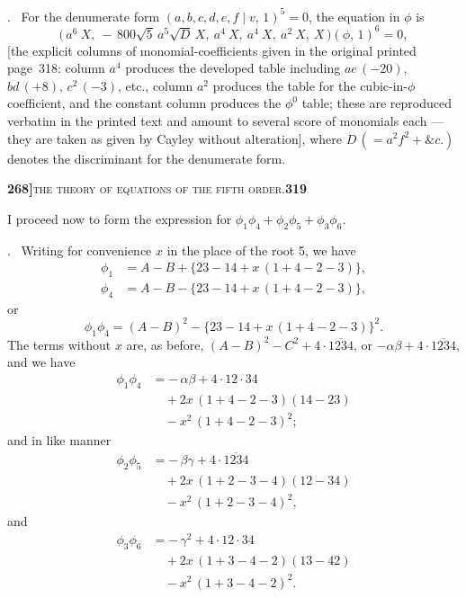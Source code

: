 \documentclass[11pt]{article}
\newcommand{\Cdel}{\mid}
\begin{document}
\medskip

. \ For the denumerate form $(a, b, c, d, e, f\Cdel v,\,1)^5 = 0$, the equation in $\phi$ is
\[
   \bigl(\,a^6\ X,\ -\,800\sqrt{5}\,a^5\sqrt{D}\,X,\ a^4\ X,\ a^4\ X,\ a^2\ X,\ X\,\bigr)(\phi,\,1)^6 = 0,
\]
[the explicit columns of monomial-coefficients given in the original printed page~318: column $a^4$ produces the developed table including $a e\,(-20)$, $b d\,(+8)$, $c^2\,(-3)$, etc., column $a^2$ produces the table for the cubic-in-$\phi$ coefficient, and the constant column produces the $\phi^0$ table; these are reproduced verbatim in the printed text and amount to several score of monomials each --- they are taken as given by Cayley without alteration], where $D\,(= a^2 f^2 + \&c.)$ denotes the discriminant for the denumerate form.

\newpage
\setcounter{page}{319}

\noindent\textbf{268]}\hfill\textsc{the theory of equations of the fifth order.}\hfill\textbf{319}

\medskip

\noindent I proceed now to form the expression for $\phi_1\phi_4 + \phi_2\phi_5 + \phi_3\phi_6$.

\medskip

. \ Writing for convenience $x$ in the place of the root 5, we have
\[
\begin{aligned}
   \phi_1 &= A - B + \{23 - 14 + x\,(1 + 4 - 2 - 3)\},\\
   \phi_4 &= A - B - \{23 - 14 + x\,(1 + 4 - 2 - 3)\},
\end{aligned}
\]
or
\[
   \phi_1\phi_4 = (A - B)^2 - \{23 - 14 + x\,(1 + 4 - 2 - 3)\}^2.
\]
The terms without $x$ are, as before, $(A - B)^2 - C^2 + 4\cdot\overline{1234}$, or $-\alpha\beta + 4\cdot\overline{1234}$, and we have
\[
\begin{aligned}
   \phi_1\phi_4 &= -\,\alpha\beta + 4\cdot 12\cdot 34\\
   &\quad{} + 2 x\,(1 + 4 - 2 - 3)(14 - 23)\\
   &\quad{} - x^2\,(1 + 4 - 2 - 3)^2;
\end{aligned}
\]
and in like manner
\[
\begin{aligned}
   \phi_2\phi_5 &= -\,\beta\gamma + 4\cdot\overline{1234}\\
   &\quad{} + 2 x\,(1 + 2 - 3 - 4)(12 - 34)\\
   &\quad{} - x^2\,(1 + 2 - 3 - 4)^2,
\end{aligned}
\]
and
\[
\begin{aligned}
   \phi_3\phi_6 &= -\,\gamma^2 + 4\cdot 12\cdot 34\\
   &\quad{} + 2 x\,(1 + 3 - 4 - 2)(13 - 42)\\
   &\quad{} - x^2\,(1 + 3 - 4 - 2)^2.
\end{aligned}
\]
\end{document}
